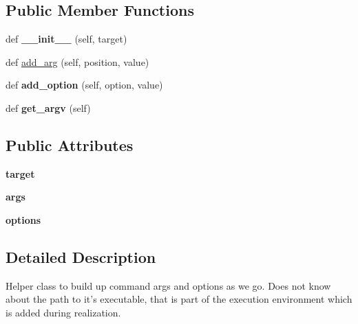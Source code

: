 \subsection*{Public Member Functions}
\begin{DoxyCompactItemize}
\item 
\mbox{\label{classcodar_1_1cheetah_1_1parameters_1_1_code_command_a706c2fb3961bd3a8eb91d1034020893c}} 
def {\bfseries \+\_\+\+\_\+init\+\_\+\+\_\+} (self, target)
\item 
def \hyperlink{classcodar_1_1cheetah_1_1parameters_1_1_code_command_a869d18602cb7e516157c871a6a80527e}{add\+\_\+arg} (self, position, value)
\item 
\mbox{\label{classcodar_1_1cheetah_1_1parameters_1_1_code_command_ab2d06207053333ebd442800d991a5056}} 
def {\bfseries add\+\_\+option} (self, option, value)
\item 
\mbox{\label{classcodar_1_1cheetah_1_1parameters_1_1_code_command_a94799c614d5777f929817d9a855a0f88}} 
def {\bfseries get\+\_\+argv} (self)
\end{DoxyCompactItemize}
\subsection*{Public Attributes}
\begin{DoxyCompactItemize}
\item 
\mbox{\label{classcodar_1_1cheetah_1_1parameters_1_1_code_command_a52652e8b3bc2c4bcf55f7edd13f8258c}} 
{\bfseries target}
\item 
\mbox{\label{classcodar_1_1cheetah_1_1parameters_1_1_code_command_a5130989e66f83d0d6750f32a84edf44e}} 
{\bfseries args}
\item 
\mbox{\label{classcodar_1_1cheetah_1_1parameters_1_1_code_command_a7b7c38e78d429b1395daf3e6b199aafe}} 
{\bfseries options}
\end{DoxyCompactItemize}


\subsection{Detailed Description}
\begin{DoxyVerb}Helper class to build up command args and options as we go. Does not
know about the path to it's executable, that is part of the execution
environment which is added during realization.
\end{DoxyVerb}
 

